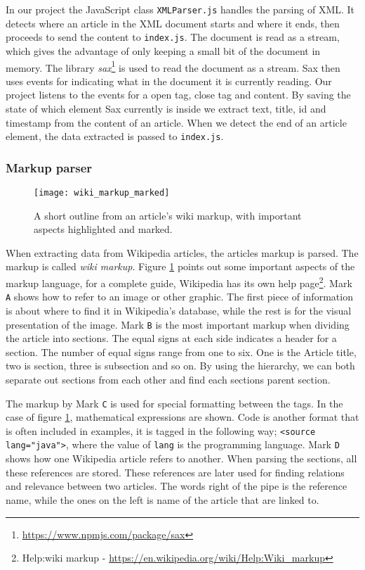 In our project the JavaScript class \texttt{XMLParser.js} handles the parsing of XML. It detects where an article in the XML document starts and where it ends, then proceeds to send the content to \texttt{index.js}. The document is read as a stream, which gives the advantage of only keeping a small bit of the document in memory. The library \textit{sax}\footnote{\url{https://www.npmjs.com/package/sax}} is used to read the document as a stream. Sax then uses events for indicating what in the document it is currently reading. Our project listens to the events for a open tag, close tag and content. By saving the state of which element Sax currently is inside we extract text, title, id and timestamp from the content of an article. When we detect the end of an article element, the data extracted is passed to \texttt{index.js}.

\subsubsection{Markup parser}
\begin{figure}[h]
\caption{A short outline from an article's wiki markup, with important aspects highlighted and marked. }
\texttt{[image: wiki\_markup\_marked]}
\label{fig:wiki_markup}
\end{figure}

When extracting data from Wikipedia articles, the articles markup is parsed. The markup is called \textit{wiki markup}. Figure \ref{fig:wiki_markup} points out some important aspects of the markup language, for a complete guide, Wikipedia has its own help page\footnote{Help:wiki markup - \url{https://en.wikipedia.org/wiki/Help:Wiki_markup}}. Mark \texttt{A} shows how to refer to an image or other graphic. The first piece of information is about where to find it in Wikipedia's database, while the rest is for the visual presentation of the image. Mark \texttt{B} is the most important markup when dividing the article into sections. The equal signs at each side indicates a header for a section. The number of equal signs range from one to six. One is the Article title, two is section, three is subsection and so on. By using the hierarchy, we can both separate out sections from each other and find each sections parent section.

The markup by Mark \texttt{C} is used for special formatting between the tags. In the case of figure \ref{fig:wiki_markup}, mathematical expressions are shown. Code is another format that is often included in examples, it is tagged in the following way; \texttt{<source lang="java">}, where the value of \texttt{lang} is the programming language. Mark \texttt{D} shows how one Wikipedia article refers to another. When parsing the sections, all these references are stored. These references are later used for finding relations and relevance between two articles. The words right of the pipe is the reference name, while the ones on the left is name of the article that are linked to. 


